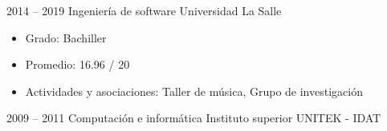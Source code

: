 
\begin{entrylist}
	\entry
		{2014 -- 2019}
		{Ingeniería de software}
		{Universidad La Salle}
		{
		    \vspace{-5mm}
		    \begin{itemize}
		        \setlength\itemsep{0pt}
		        \item Grado: Bachiller
		        \item Promedio: 16.96 / 20
		        \item Actividades y asociaciones: Taller de música, Grupo de investigación
		    \end{itemize}
		}
	\entry
		{2009 -- 2011}
		{Computación e informática}
		{Instituto superior UNITEK - IDAT}
		{
        }
\end{entrylist}

